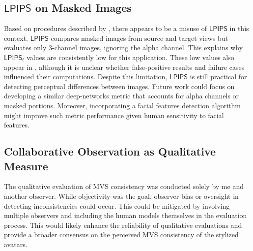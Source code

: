 \subsection{$\mathsf{LPIPS}$ on Masked Images}
Based on procedures described by \textcite{Liu.2024}, there appears to be a misuse of $\mathsf{LPIPS}$ in this context. $\mathsf{LPIPS}$ compares masked images from source and target views but evaluates only 3-channel images, ignoring the alpha channel. This explains why $\mathsf{LPIPS}_{t}$ values are consistently low for this application. These low values also appear in \textcite{Liu.2024}, although it is unclear whether false-positive results and failure cases influenced their computations. Despite this limitation, $\mathsf{LPIPS}$ is still practical for detecting perceptual differences between images. Future work could focus on developing a similar deep-networks metric that accounts for alpha channels or masked portions. Moreover, incorporating a facial features detection algorithm might improve such metric performance given human sensitivity to facial features.

\subsection{Collaborative Observation as Qualitative Measure}

The qualitative evaluation of MVS consistency was conducted solely by me and another observer. While objectivity was the goal, observer bias or oversight in detecting inconsistencies could occur. This could be mitigated by involving multiple observers and including the human models themselves in the evaluation process. This would likely enhance the reliability of qualitative evaluations and provide a broader consensus on the perceived MVS consistency of the stylized avatars.